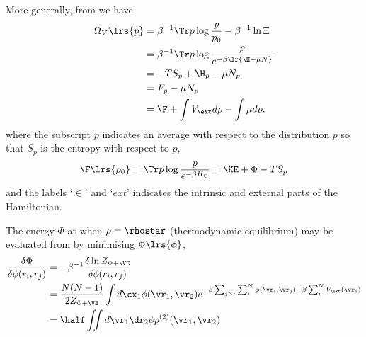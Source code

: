 {More generally, from \eqnref{} we have
\begin{align}
  \Omega_V\lrs{p} &= \beta^{-1} \Tr p \log \frac{p}{p_0}  - \beta^{-1}\ln \Xi \\
  &= \beta^{-1} \Tr p \log \frac{p}{e^{-\beta\lr{\H - \mu N}}}\\
  &= - T S_p + \H_p - \mu N_p \\
  &= F_p - \mu N_p\\
 &= \F + \int V_\ext d\rho - \int \mu d \rho.
\end{align}
where the subscript $p$ indicates an average with respect to the distribution $p$ so that  $S_p$ is the entropy with respect to $p$,
\begin{align}
 \F\lrs {\rho_0} = \Tr p \log\frac{p}{e^{-\beta H_\in}} = \KE + \Phi - TS_p
\end{align}
and the labels `$\in$' and `$ext$' indicates the intrinsic and external parts of the  Hamiltonian.

The energy $\Phi$ at when  $\rho = \rhostar$ (thermodynamic equilibrium)
may be evaluated from by minimising $\Phi\lrs{\phi}$,
\begin{align}
\frac{\delta \Phi}{\delta \phi(r_i, r_j) } &= - \beta^{-1} \frac{\delta \ln Z_{\Phi+\VE}}{\delta \phi(r_i, r_j)} \\
&= \frac{N(N-1)}{2 Z_{\Phi+\VE}}\int d\cx_1 \phi(\vr_1,\vr_2) e^{-\beta\sum_{j>i} \sum_i^N \phi(\vr_i, \vr_j)-\beta\sum_i^N V_\ext(\vr_i)} \\
&= \half \iint d\vr_1 \dr_2 \phi p^{(2)}(\vr_1,\vr_2)
\end{align}






}
